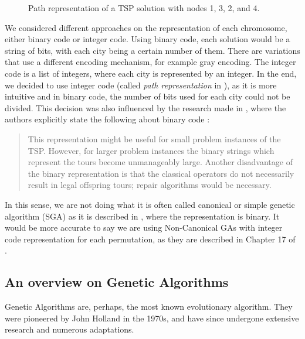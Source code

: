\documentclass[12pt]{article}
\begin{document}
\begin{figure}[h]
    \centering
    \caption{Path representation of a TSP solution with nodes 1, 3, 2, and 4.}
    \label{fig:tsp_example}
\end{figure}


We considered different approaches on the representation of each chromosome, either binary code or integer code. Using binary code, each solution would be a string of bits, with each city being a certain number of them. There are variations that use a different encoding mechanism, for example gray encoding. The integer code is a list of integers, where each city is represented by an integer. In the end, we decided to use integer code (called \textit{path representation} in \cite{Larranaga1999}), as it is more intuitive and in binary code, the number of bits used for each city could not be divided. This decision was also influenced by the research made in \cite{Larranaga1999}, where the authors explicitly state the following about binary code :
\begin{quote}
This representation might be useful for small problem instances of the TSP.
However, for larger problem instances the binary strings which represent
the tours become unmanageably large. Another disadvantage of the binary
representation is that the classical operators do not necessarily result in legal
offspring tours; repair algorithms would be necessary.
\end{quote}

In this sense, we are not doing what it is often called canonical or simple genetic algorithm (SGA) as it is described in \cite{Eiben2003}, where the representation is binary. It would be more accurate to say we are using Non-Canonical GAs with integer code representation for each permutation, as they are described in Chapter 17 of \cite{Back2000}.  



\subsection{An overview on Genetic Algorithms}
Genetic Algorithms are, perhaps, the most known evolutionary algorithm. They were pioneered by John Holland in the 1970s, and have since undergone extensive research and numerous adaptations. 
\end{document}
